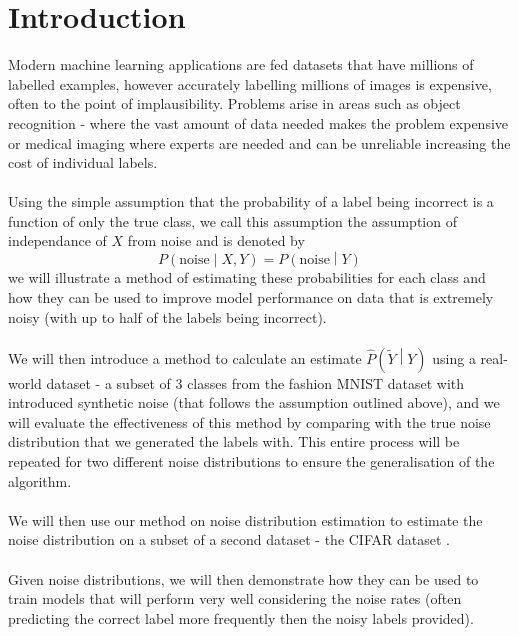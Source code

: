 \documentclass{article} %
\newcommand{\PR}[1]{{P\left(#1\right)}}
\newcommand{\PRh}[1]{{\widehat P\left(#1\right)}}
\newcommand{\Yn}{\widetilde{Y}}
\newcommand{\noiseassumption}{assumption of independance of $X$ from noise }
\begin{document}
\section{Introduction}
Modern machine learning applications are fed datasets that have millions of labelled examples, however accurately labelling millions of images is expensive, often to the point of implausibility.
Problems arise in areas such as object recognition - where the vast amount of data needed makes the problem expensive \cite{DL_robust} or medical imaging where experts are needed and can be unreliable increasing the cost of individual labels.
\\\\
Using the simple assumption that the probability of a label being incorrect is a function of only the true class, we call this assumption the \noiseassumption and is denoted by
\begin{equation}
\label{eqn:noise_assumption}
\PR{\mbox{noise}\middle|X, Y}=\PR{\mbox{noise}\middle|Y}
\end{equation}
we will illustrate a method of estimating these probabilities for each class and how they can be used to improve model performance on data that is extremely noisy (with up to half of the labels being incorrect).\\\\
We will then introduce a method to calculate an estimate $\PRh{\Yn\middle|Y}$ using a real-world dataset - a subset of 3 classes from the fashion MNIST dataset\cite{FMNIST} with introduced synthetic noise (that follows the assumption outlined above), and we will evaluate the effectiveness of this method by comparing with the true noise distribution that we generated the labels with. This entire process will be repeated for two different noise distributions to ensure the generalisation of the algorithm.
\\\\
We will then use our method on noise distribution estimation to estimate the noise distribution on a subset of a second dataset - the CIFAR dataset \cite{CIFAR}.
\\\\
Given noise distributions, we will then demonstrate how they can be used to train models that will perform very well considering the noise rates (often predicting the correct label more frequently then the noisy labels provided).
\end{document}
